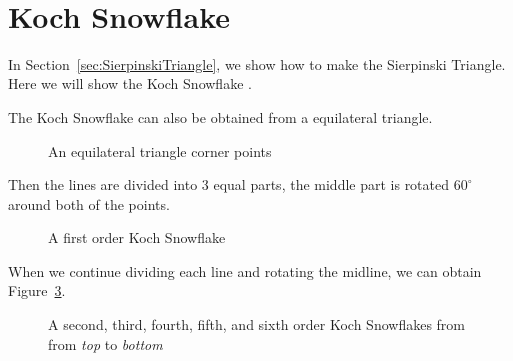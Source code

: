 \clearpage
\newpage
\mbox{~}
\section{Koch Snowflake}
\label{sec:KochSnowflake}

In Section~\ref{sec:SierpinskiTriangle}, we show how to make the Sierpinski Triangle.
Here we will show the Koch Snowflake \cite{KS, OP, LA}.

The Koch Snowflake can also be obtained from a equilateral triangle.

\begin{figure}[htb]
\centering
{}
\caption{An equilateral triangle corner points}
\label{fig:triangleKSP}
\end{figure}

Then the lines are divided into 3 equal parts, the middle part is rotated $60^\circ$ around both of the points.

\begin{figure}[htb]
\centering
{}
\caption{A first order Koch Snowflake}
\label{fig:KSP1}
\end{figure}

When we continue dividing each line and rotating the midline, we can obtain Figure~\ref{fig:KSP2}.

\textcolor{gray}{
\lipsum[2]
}

\begin{figure}[htb]
\centering
{}
\caption{A second, third, fourth, fifth, and sixth order Koch Snowflakes from 
from \textit{top} to \textit{bottom}}
\label{fig:KSP2}
\end{figure}


